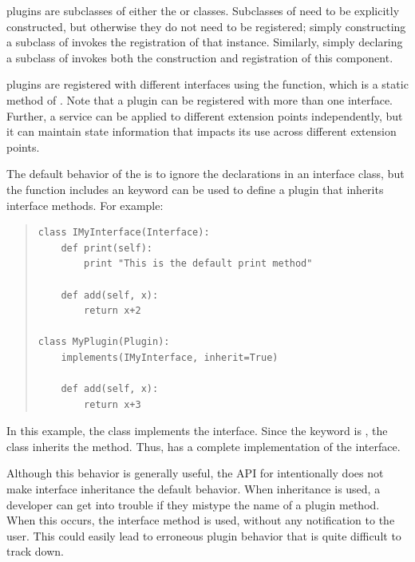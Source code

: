 \pcasp plugins are subclasses of either the  or 
classes. Subclasses of  need to be explicitly constructed,
but otherwise they do not need to be registered; simply constructing a
subclass of  invokes the registration of that instance. Similarly,
simply declaring a subclass of  invokes both the construction
and registration of this component.

\pcasp plugins are registered with different interfaces using the 
function, which is a static method of . Note that a plugin can be
registered with more than one interface. Further, a service can be applied to different
extension points independently, but it can maintain state information
that impacts its use across different extension points.

The default behavior of the \pcasp is to ignore the declarations in an interface class, but
the  function includes an  keyword can be used to define a plugin that 
inherits interface methods.  For example:
\begin{quotation}
\begin{lstlisting}
class IMyInterface(Interface):
    def print(self):
        print "This is the default print method"

    def add(self, x):
        return x+2

class MyPlugin(Plugin):
    implements(IMyInterface, inherit=True)

    def add(self, x):
        return x+3
\end{lstlisting}
\end{quotation}
In this example, the  class implements the  interface.  Since the  keyword is , the  class inherits the  method.  Thus,  has a complete implementation of the  interface.

Although this behavior is generally useful, the API for \pcasp
intentionally does not make interface inheritance the default behavior.
When inheritance is used, a developer can get into trouble if they mistype
the name of a plugin method.  When this occurs, the interface method is
used, without any notification to the user.  This could easily lead to
erroneous plugin behavior that is quite difficult to track down.

